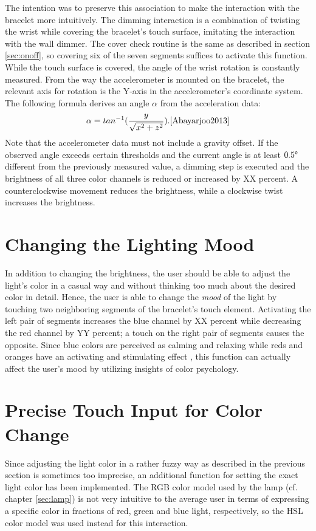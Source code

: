 The intention was to preserve this association to make the interaction with the bracelet more intuitively. The dimming interaction is a combination of twisting the wrist while covering the bracelet's touch surface, imitating the interaction with the wall dimmer. The cover check routine is the same as described in section \ref{sec:onoff}, so covering six of the seven segments suffices to activate this function. While the touch surface is covered, the angle of the wrist rotation is constantly measured. From the way the accelerometer is mounted on the bracelet, the relevant axis for rotation is the Y-axis in the accelerometer's coordinate system. The following formula derives an angle $\alpha$ from the acceleration data:
\[ %
\alpha = tan^{-1}(\frac{y}{\sqrt{x^2 + z^2}}). \cite{Abayarjoo2013}
\]
Note that the accelerometer data must not include a gravity offset. If the observed angle exceeds certain thresholds and the current angle is at least $0.5\degree$ different from the previously measured value, a dimming step is executed and the brightness of all three color channels is reduced or increased by XX percent. A counterclockwise movement reduces the brightness, while a clockwise twist increases the brightness.

\section{Changing the Lighting Mood}
In addition to changing the brightness, the user should be able to adjust the light's color in a casual way and without thinking too much about the desired color in detail. Hence, the user is able to change the \textit{mood} of the light by touching two neighboring segments of the bracelet's touch element. Activating the left pair of segments increases the blue channel by XX percent while decreasing the red channel by YY percent; a touch on the right pair of segments causes the opposite. Since blue colors are perceived as calming and relaxing while reds and oranges have an activating and stimulating effect \cite{Rosenstein1985}, this function can actually affect the user's mood by utilizing insights of color psychology.

\section{Precise Touch Input for Color Change}
Since adjusting the light color in a rather fuzzy way as described in the previous section is sometimes too imprecise, an additional function for setting the exact light color has been implemented. The RGB color model used by the lamp (cf. chapter \ref{sec:lamp}) is not very intuitive to the average user in terms of expressing a specific color in fractions of red, green and blue light, respectively, so the \ac{HSL} color model was used instead for this interaction.

